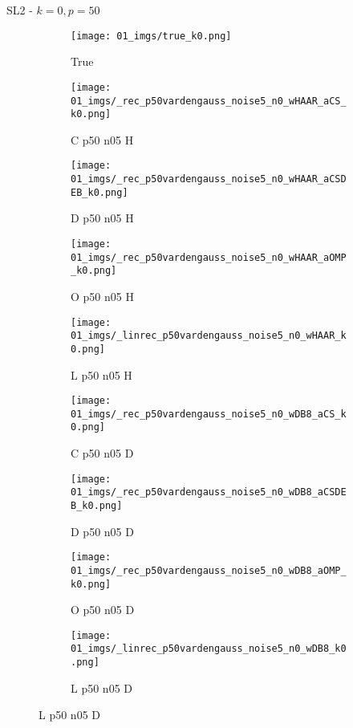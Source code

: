 \begin{frame}{SL2 - $k=0,p=50$}{}
\begin{figure}
\begin{subfigure}{0.1\textwidth}
\texttt{[image: 01\_imgs/true\_k0.png]}
\caption*{\Tiny True}
\end{subfigure}
\begin{subfigure}{0.1\textwidth}
\texttt{[image: 01\_imgs/\_rec\_p50vardengauss\_noise5\_n0\_wHAAR\_aCS\_k0.png]}
\caption*{\Tiny C p50 n05 H}
\end{subfigure}
\begin{subfigure}{0.1\textwidth}
\texttt{[image: 01\_imgs/\_rec\_p50vardengauss\_noise5\_n0\_wHAAR\_aCSDEB\_k0.png]}
\caption*{\Tiny D p50 n05 H}
\end{subfigure}
\begin{subfigure}{0.1\textwidth}
\texttt{[image: 01\_imgs/\_rec\_p50vardengauss\_noise5\_n0\_wHAAR\_aOMP\_k0.png]}
\caption*{\Tiny O p50 n05 H}
\end{subfigure}
\begin{subfigure}{0.1\textwidth}
\texttt{[image: 01\_imgs/\_linrec\_p50vardengauss\_noise5\_n0\_wHAAR\_k0.png]}
\caption*{\Tiny L p50 n05 H}
\end{subfigure}
\begin{subfigure}{0.1\textwidth}
\texttt{[image: 01\_imgs/\_rec\_p50vardengauss\_noise5\_n0\_wDB8\_aCS\_k0.png]}
\caption*{\Tiny C p50 n05 D}
\end{subfigure}
\begin{subfigure}{0.1\textwidth}
\texttt{[image: 01\_imgs/\_rec\_p50vardengauss\_noise5\_n0\_wDB8\_aCSDEB\_k0.png]}
\caption*{\Tiny D p50 n05 D}
\end{subfigure}
\begin{subfigure}{0.1\textwidth}
\texttt{[image: 01\_imgs/\_rec\_p50vardengauss\_noise5\_n0\_wDB8\_aOMP\_k0.png]}
\caption*{\Tiny O p50 n05 D}
\end{subfigure}
\begin{subfigure}{0.1\textwidth}
\texttt{[image: 01\_imgs/\_linrec\_p50vardengauss\_noise5\_n0\_wDB8\_k0.png]}
\caption*{\Tiny L p50 n05 D}
\end{subfigure}

\vspace{5pt}


\end{figure}
\end{frame}
